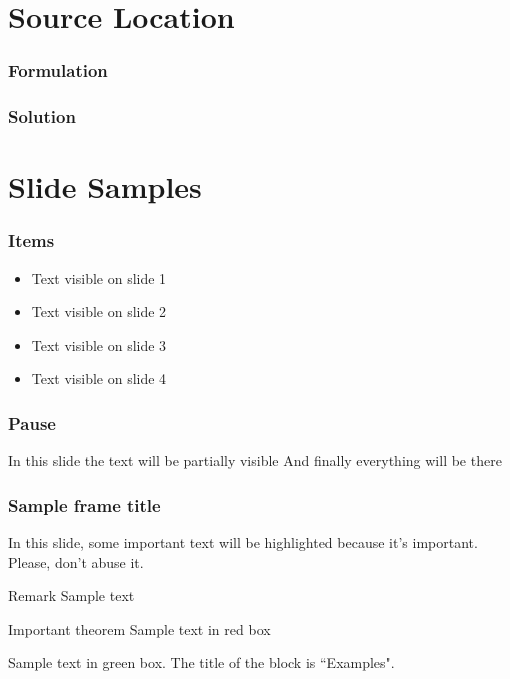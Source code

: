 \documentclass{beamer}
\begin{document}
\section{Source Location}

\begin{frame}
    \frametitle{Formulation}
\end{frame}

\begin{frame}
    \frametitle{Solution}
\end{frame}

\section{Slide Samples}

\begin{frame}
    \frametitle{Items}
    \begin{itemize}
        \item<1-> Text visible on slide 1
        \item<2-> Text visible on slide 2
        \item<3> Text visible on slide 3
        \item<4-> Text visible on slide 4
    \end{itemize}
\end{frame}

\begin{frame}
    \frametitle{Pause}
    In this slide \pause
    the text will be partially visible \pause
    And finally everything will be there
\end{frame}

\begin{frame}
    \frametitle{Sample frame title}

    In this slide, some important text will be
    \alert{highlighted} because it's important.
    Please, don't abuse it.

    \begin{block}{Remark}
        Sample text
    \end{block}

    \begin{alertblock}{Important theorem}
        Sample text in red box
    \end{alertblock}

    \begin{examples}
        Sample text in green box. The title of the block is ``Examples".
    \end{examples}
\end{frame}
\end{document}
